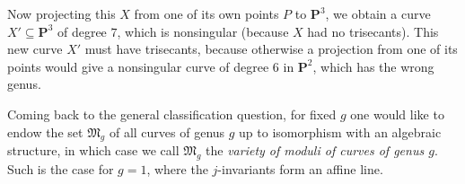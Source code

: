 {Now projecting this $X$ from one of its own points $P$ to $\mathbf P^3$, we obtain a curve $X'\subseteq\mathbf P^3$ of degree $7$, which is nonsingular (because $X$ had no trisecants). This new curve $X'$ must have trisecants, because otherwise a projection from one of its points would give a nonsingular curve of degree $6$ in $\mathbf P^2$, which has the wrong genus. 

Coming back to the general classification question, for fixed $g$ one would like to endow the set $\mathfrak M_g$ of all curves of genus $g$ up to isomorphism with an algebraic structure, in which case we call $\mathfrak M_g$ the \emph{variety of moduli of curves of genus $g$}. Such is the case for $g=1$, where the $j$-invariants form an affine line.}
